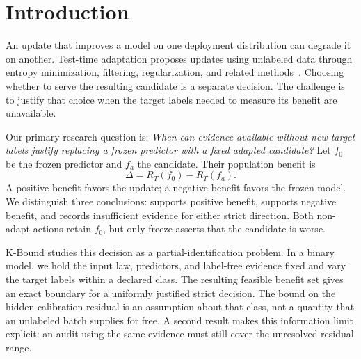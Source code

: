 \providecommand{\KBSuppRef}[3]{#2~\ref{#1}}


\section{Introduction}
\label{sec:compact-intro}

An update that improves a model on one deployment distribution can degrade it on another.
Test-time adaptation proposes updates using unlabeled data through entropy minimization,
filtering, regularization, and related methods~\cite{wang2021tent,niu2022eata,niu2023sar,wang2022cotta}.
Choosing whether to serve the resulting candidate is a separate decision. The challenge is to
justify that choice when the target labels needed to measure its benefit are unavailable.

Our primary research question is:
\emph{When can evidence available without new target labels justify replacing a frozen predictor
with a fixed adapted candidate?}
Let $f_0$ be the frozen predictor and $f_a$ the candidate. Their population benefit is
\begin{equation}
  \Delta=R_T(f_0)-R_T(f_a).
  \label{eq:compact-benefit}
\end{equation}
A positive benefit favors the update; a negative benefit favors the frozen model. We distinguish
three conclusions: \adapt supports positive benefit, \freeze supports negative benefit, and
\abstain records insufficient evidence for either strict direction. Both non-adapt actions retain
$f_0$, but only freeze asserts that the candidate is worse.

K-Bound studies this decision as a partial-identification problem. In a binary model, we hold the
input law, predictors, and label-free evidence fixed and vary the target labels within a declared
class. The resulting feasible benefit set gives an exact boundary for a uniformly justified strict
decision. The bound on the hidden calibration residual is an assumption about that class, not a
quantity that an unlabeled batch supplies for free. A second result makes this information limit
explicit: an audit using the same evidence must still cover the unresolved residual range.

